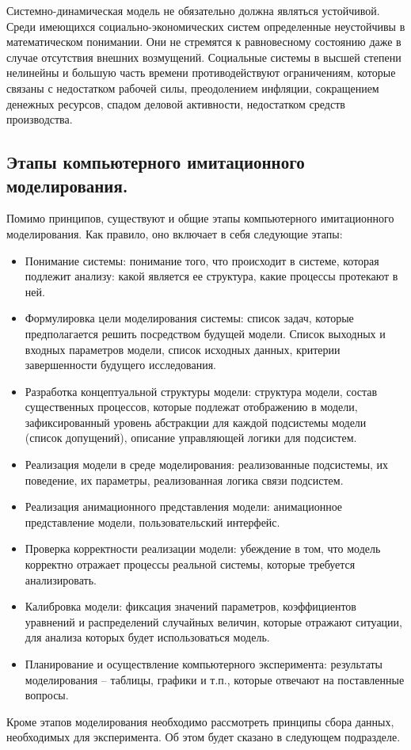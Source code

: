Системно-динамическая модель не обязательно должна являться устойчивой.
Среди имеющихся социально-экономических систем определенные неустойчивы в математическом понимании.
Они не стремятся к равновесному состоянию даже в случае отсутствия внешних возмущений.
Социальные системы в высшей степени нелинейны и большую часть времени противодействуют ограничениям, которые связаны с недостатком рабочей силы, преодолением инфляции, сокращением денежных ресурсов, спадом деловой активности, недостатком средств производства.

\subsection{Этапы компьютерного имитационного моделирования.}
Помимо принципов, существуют и общие этапы компьютерного имитационного моделирования. 
Как правило, оно включает в себя следующие этапы:
\begin{itemize}
\tightlist
\item Понимание системы: понимание того, что происходит в системе, которая
  подлежит анализу: какой является ее структура, какие процессы
  протекают в ней.
\item
  Формулировка цели моделирования системы: список задач, которые
  предполагается решить посредством будущей модели. Список выходных и
  входных параметров модели, список исходных данных, критерии
  завершенности будущего исследования.
\item
  Разработка концептуальной структуры модели: структура модели, состав
  существенных процессов, которые подлежат отображению в модели,
  зафиксированный уровень абстракции для каждой подсистемы модели
  (список допущений), описание управляющей логики для подсистем.
\item
  Реализация модели в среде моделирования: реализованные подсистемы, их
  поведение, их параметры, реализованная логика связи подсистем.
\item
  Реализация анимационного представления модели: анимационное
  представление модели, пользовательский интерфейс.
\item
  Проверка корректности реализации модели: убеждение в том, что модель
  корректно отражает процессы реальной системы, которые требуется
  анализировать.
\item
  Калибровка модели: фиксация значений параметров, коэффициентов
  уравнений и распределений случайных величин, которые отражают
  ситуации, для анализа которых будет использоваться модель.
\item
  Планирование и осуществление компьютерного эксперимента: результаты
  моделирования -- таблицы, графики и т.п., которые отвечают на
  поставленные вопросы.
\end{itemize}
Кроме этапов моделирования необходимо рассмотреть принципы сбора данных, необходимых для эксперимента. Об этом будет сказано в следующем подразделе. 

